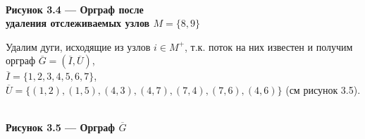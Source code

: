 \documentclass[14pt]{extarticle}%
\begin{document}
\begin{center}
\\
\textbf{Рисунок 3.4 ---  Орграф после \\удаления отслеживаемых узлов $M=\{8,9\}$}
\end{center}

Удалим дуги, исходящие из узлов $i\in M^+$, т.к. поток на них известен и получим орграф $\overline{G}=(\overline{I},\overline{U})$,\\ $\overline{I}=\{1,2,3,4,5,6,7\}$,\\ $\overline{U}=\{(1 , 2), (1 , 5), (4 , 3),  (4 , 7), (7 , 4), (7 , 6),  (4 , 6)\}$ (см рисунок 3.5).

\begin{center}
\\
\textbf{Рисунок 3.5 --- Орграф $\overline{G}$}
\end{center}
\end{document}
